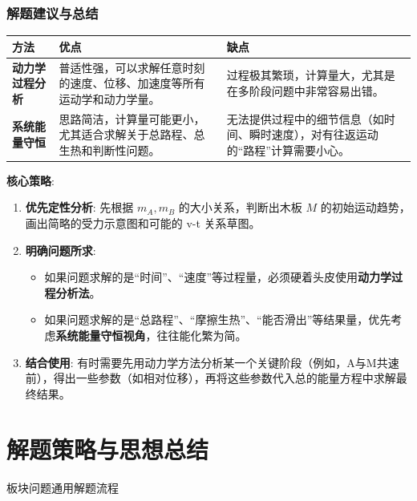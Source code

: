 \documentclass[a4paper,11pt]{ctexart}
\begin{document}
\subsubsection{解题建议与总结}

\begin{tabular}{|l|p{6cm}|p{6cm}|}
    \hline
    \textbf{方法} & \textbf{优点} & \textbf{缺点} \\
    \hline
    \textbf{动力学过程分析} & 普适性强，可以求解任意时刻的速度、位移、加速度等所有运动学和动力学量。 & 过程极其繁琐，计算量大，尤其是在多阶段问题中非常容易出错。 \\
    \hline
    \textbf{系统能量守恒} & 思路简洁，计算量可能更小，尤其适合求解关于总路程、总生热和判断性问题。 & 无法提供过程中的细节信息（如时间、瞬时速度），对有往返运动的“路程”计算需要小心。 \\
    \hline
\end{tabular}

\bigskip
\textcolor{HighlightColor}{\textbf{核心策略}}:
\begin{enumerate}
    \item \textbf{优先定性分析}: 先根据 $m_A, m_B$ 的大小关系，判断出木板 $M$ 的初始运动趋势，画出简略的受力示意图和可能的 v-t 关系草图。
    \item \textbf{明确问题所求}:
        \begin{itemize}
            \item 如果问题求解的是“时间”、“速度”等过程量，必须硬着头皮使用\textbf{动力学过程分析法}。
            \item 如果问题求解的是“总路程”、“摩擦生热”、“能否滑出”等结果量，优先考虑\textbf{系统能量守恒视角}，往往能化繁为简。
        \end{itemize}
    \item \textbf{结合使用}: 有时需要先用动力学方法分析某一个关键阶段（例如，A与M共速前），得出一些参数（如相对位移），再将这些参数代入总的能量方程中求解最终结果。
\end{enumerate}

\section{解题策略与思想总结}

\begin{NoteRoadmap}{板块问题通用解题流程}
\end{NoteRoadmap}
\end{document}
